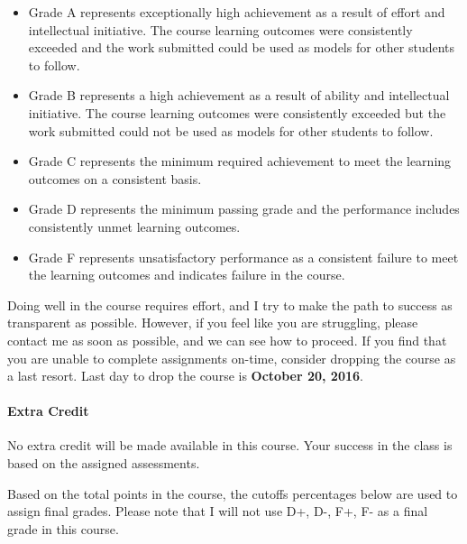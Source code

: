 \begin{itemize}
	\item Grade A represents exceptionally high achievement as a result of effort and intellectual initiative. The course learning outcomes were consistently exceeded and the work submitted could be used as models for other students to follow.
	\item Grade B represents a high achievement as a result of ability and intellectual initiative. The course learning outcomes were consistently exceeded but the work submitted could not be used as models for other students to follow.
	\item Grade C represents the minimum required achievement to meet the learning outcomes on a consistent basis. 
	\item Grade D represents the minimum passing grade and the performance includes consistently unmet learning outcomes. 
	\item Grade F represents unsatisfactory performance as a consistent failure to meet the learning outcomes and indicates failure in the course.
\end{itemize}

Doing well in the course requires effort, and I try to make the path to success as transparent as possible. However, if you feel like you are struggling, please contact me as soon as possible, and we can see how to proceed. If you find that you are unable to complete assignments on-time, consider dropping the course as a last resort. Last day to drop the course is \textbf{October 20, 2016}. 

\paragraph{Extra Credit} No extra credit will be made available in this course. Your success in the class is based on the assigned assessments.

Based on the total points in the course, the cutoffs percentages below are used to assign final grades. Please note that I will not use D+, D-, F+, F- as a final grade in this course. 

